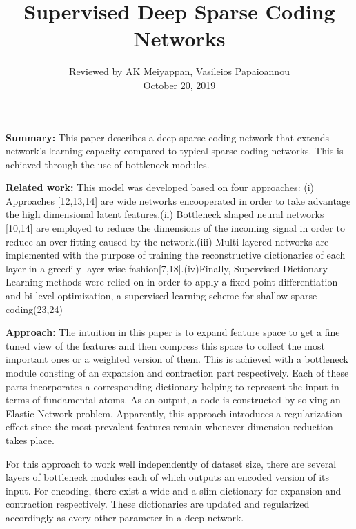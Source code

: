 \documentclass[10pt,twocolumn,letterpaper]{article}
\begin{document}
\title{Supervised Deep Sparse Coding Networks}

\author{Reviewed by AK Meiyappan, Vasileios Papaioannou\\ October 20, 2019}


\maketitle


\noindent\textbf{Summary:} This paper describes a deep sparse coding network that extends network's learning capacity compared to typical sparse coding networks. This is achieved through the use of bottleneck modules.

\noindent\textbf{Related work:} This model was developed based on four approaches: (i) Approaches [12,13,14] are wide networks encooperated in order to take advantage the high dimensional latent features.(ii) Bottleneck shaped neural networks [10,14] are employed to reduce the dimensions of the incoming signal in order to reduce an over-fitting caused by the network.(iii) Multi-layered networks are implemented with the purpose of training the reconstructive dictionaries of each layer in a greedily layer-wise fashion[7,18].(iv)Finally, Supervised Dictionary Learning methods were relied on in order to apply a fixed point differentiation and bi-level optimization, a supervised learning scheme for shallow sparse coding(23,24) 

\noindent\textbf{Approach:} The intuition in this paper is to expand feature space to get a fine tuned view of the features and then compress this space to collect the most important ones or a weighted version of them. This is achieved with a bottleneck module consting of an expansion and contraction part respectively. Each of these parts incorporates a corresponding dictionary helping to represent the input in terms of fundamental atoms. As an output, a code is constructed by solving an Elastic Network problem. Apparently, this approach introduces a regularization effect since the most prevalent features remain whenever dimension reduction takes place.

For this approach to work well independently of dataset size, there are several layers of bottleneck modules each of which outputs an encoded version of its input. For encoding, there exist a wide and a slim dictionary for expansion and contraction respectively. These dictionaries are updated and regularized accordingly as every other parameter in a deep network.
\end{document}
